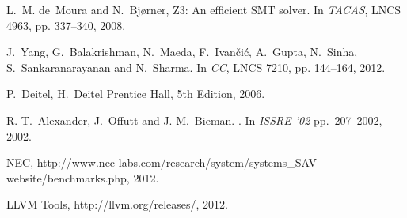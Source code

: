 \documentclass[a4paper]{llncs}
\begin{document}
{\begin{thebibliography}{10}
L.~M. de~Moura and N.~Bj{\o}rner, Z3: An efficient {SMT} solver.
\newblock In {\em  TACAS}, LNCS 4963, pp. 337--340, 2008.

J.~Yang, G.~Balakrishman, N.~Maeda, F.~Ivan\v{c}i\'c, A.~Gupta, N.~Sinha, S.~Sankaranarayanan and N.~Sharma.
\newblock In {\em CC}, LNCS 7210, pp. 144--164, 2012.

P.~Deitel, H.~Deitel
\newblock Prentice Hall, 5th Edition, 2006.

R. T.~Alexander, J.~Offutt and J. M.~Bieman. .
\newblock In {\em ISSRE '02} pp.~207--2002, 2002.

NEC, http://www.nec-labs.com/research/system/systems\_SAV-website/benchmarks.php, 2012.

LLVM Tools, http://llvm.org/releases/, 2012.

\end{thebibliography}}
\end{document}
